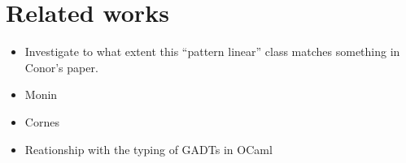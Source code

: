 \documentclass{llncs}
\begin{document}
\section{Related works}
\begin{itemize}
\item Investigate to what extent this ``pattern linear'' class matches
  something in Conor's paper.
\item Monin
\item Cornes
\item Reationship with the typing of GADTs in OCaml
\end{itemize}
\end{document}
